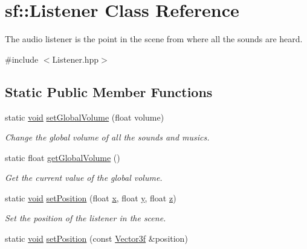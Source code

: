 \hypertarget{classsf_1_1_listener}{\section{sf\-:\-:Listener Class Reference}
\label{classsf_1_1_listener}
}


The audio listener is the point in the scene from where all the sounds are heard.  




{\ttfamily \#include $<$Listener.\-hpp$>$}

\subsection*{Static Public Member Functions}
\begin{DoxyCompactItemize}
\item 
static \hyperlink{glutf90_8h_ac778d6f63f1aaf8ebda0ce6ac821b56e}{void} \hyperlink{classsf_1_1_listener_a803a24a1fc04620cacc9f88c6fbc0e3a}{set\-Global\-Volume} (float volume)
\begin{DoxyCompactList}\small\item\em Change the global volume of all the sounds and musics. \end{DoxyCompactList}\item 
static float \hyperlink{classsf_1_1_listener_a137ea535799bdf70be6ec969673d4d33}{get\-Global\-Volume} ()
\begin{DoxyCompactList}\small\item\em Get the current value of the global volume. \end{DoxyCompactList}\item 
static \hyperlink{glutf90_8h_ac778d6f63f1aaf8ebda0ce6ac821b56e}{void} \hyperlink{classsf_1_1_listener_a5bc2d8d18ea2d8f339d23cbf17678564}{set\-Position} (float \hyperlink{gl3_8h_a92d0386e5c19fb81ea88c9f99644ab1d}{x}, float \hyperlink{gl3_8h_a66ddd433d2cacfe27f5906b7e86faeed}{y}, float \hyperlink{gl3_8h_acb78bf1972d3eaf07da34ff2e0a2f133}{z})
\begin{DoxyCompactList}\small\item\em Set the position of the listener in the scene. \end{DoxyCompactList}\item 
static \hyperlink{glutf90_8h_ac778d6f63f1aaf8ebda0ce6ac821b56e}{void} \hyperlink{classsf_1_1_listener_a28a27d85cfbf8065c535c39176898fcb}{set\-Position} (const \hyperlink{namespacesf_af97357d7d32e7d6a700d03be2f3b4811}{Vector3f} \&position)

\end{DoxyCompactItemize}
